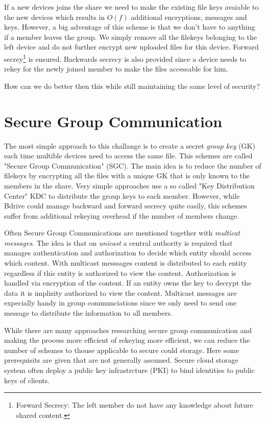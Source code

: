 If a new devices joins the share we need to make the existing file keys avaiable to the new devices which results in $O(f)$ additional encryptions, messages and keys. However, a big adventage of this scheme is that we don't have to anything if a member leaves the group. We simply remove all the filekeys belonging to the left device and do not further encrypt new uploaded files for this device. Forward secrey\footnote{Forward Secrecy: The left member do not have any knowledge about future shared content.} is ensured. Backwards secrecy is also provided since a device needs to rekey for the newly joined member to make the files accessable for him. 

How can we do better then this while still maintaining the same level of security? 


\section{Secure Group Communication}
The most simple approach to this challange is to create a secret \textit{group key} (GK) each time multible devices need to access the same file. This schemes are called "Secure Group Communication" (SGC). The main idea is to reduce the number of filekeys by encrypting all the files with a unique GK that is only known to the members in the share. Very simple approaches use a so called "Key Distribution Center" KDC to distribute the group keys to each member. However, while Bdrive could manage backward and forward secrecy quite easily, this schemes suffer from additional rekeying overhead if the number of members change. 

Often Secure Group Communications are mentioned together with \textit{multicat messages}. The idea is that on \textit{unicast} a central authority is required that manages authentication and authorization to decide which entity should access which content. With multicast messsages content is distributed to each entity regardless if this entity is authorized to view the content. Authorization is handled via encryption of the content. If an entity owns the key to decrypt the data it is implizity authorized to view the content. Multicast messages are expecially handy in group communciations since we only need to send one message to distribute the information to all members. 

While there are many approaches researching secure group communication and making the process more efficient of rekeying more efficient, we can reduce the number of schemes to thouse applicable to secure could storage. Here some prerequisits are given that are not generally assumed. Secure cloud storage system often deploy a public key infrastrcture (PKI) to bind identities to public keys of clients.

